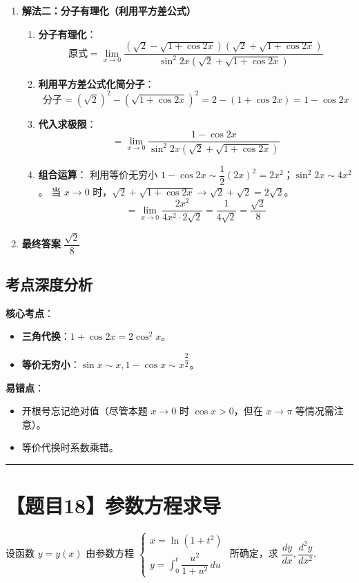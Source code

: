 \documentclass[UTF8,10pt]{ctexart}
\newenvironment{redenv}{\color{red}}{}
\newenvironment{detailedanalysis}{%
    \color{red}
    \begin{enumerate}[label=\textbf{第\arabic*步：}, leftmargin=*, align=left, itemsep=0pt, parsep=0pt, topsep=0pt, partopsep=0pt]
}{%
    \end{enumerate}
}
\newenvironment{conceptbox}{%
    \begin{tcolorbox}[colback=red!5, colframe=red!50!black, title=概念解析, fonttitle=\bfseries, top=2pt, bottom=2pt, left=2pt, right=2pt]
}{%
    \end{tcolorbox}
}
\newcommand{\problemrule}{\par\filbreak\noindent\rule{\textwidth}{1.5pt}\vspace{-0.5em}}
\begin{document}
\begin{redenv}
\begin{detailedanalysis}
\item \textbf{解法二：分子有理化（利用平方差公式）}
\begin{enumerate}[label=(\alph*)]
    \item \textbf{分子有理化}：
    \[ \text{原式} = \lim\limits_{x \to 0} \dfrac{(\sqrt{2} - \sqrt{1 + \cos 2x})(\sqrt{2} + \sqrt{1 + \cos 2x})}{\sin^2 2x (\sqrt{2} + \sqrt{1 + \cos 2x})} \]
    \item \textbf{利用平方差公式化简分子}：
    \[ \text{分子} = (\sqrt{2})^2 - (\sqrt{1+\cos 2x})^2 = 2 - (1 + \cos 2x) = 1 - \cos 2x \]
    \item \textbf{代入求极限}：
    \[ = \lim\limits_{x \to 0} \dfrac{1 - \cos 2x}{\sin^2 2x (\sqrt{2} + \sqrt{1 + \cos 2x})} \]
    \item \textbf{组合运算}：
    利用等价无穷小 $1 - \cos 2x \sim \dfrac{1}{2}(2x)^2 = 2x^2$；$\sin^2 2x \sim 4x^2$。
    当 $x \to 0$ 时，$\sqrt{2} + \sqrt{1 + \cos 2x} \to \sqrt{2} + \sqrt{2} = 2\sqrt{2}$。
    \[ = \lim\limits_{x \to 0} \dfrac{2x^2}{4x^2 \cdot 2\sqrt{2}} = \dfrac{1}{4\sqrt{2}} = \dfrac{\sqrt{2}}{8} \]
\end{enumerate}

\item \textbf{最终答案}
$\dfrac{\sqrt{2}}{8}$
\end{detailedanalysis}

\subsection*{考点深度分析}
\begin{conceptbox}
\textbf{核心考点}：
\begin{itemize}
    \item \textbf{三角代换}：$1+\cos 2x = 2\cos^2 x$。
    \item \textbf{等价无穷小}：$\sin x \sim x, 1-\cos x \sim x^\dfrac{2}{2}$。
\end{itemize}
\textbf{易错点}：
\begin{itemize}
    \item 开根号忘记绝对值（尽管本题 $x \to 0$ 时 $\cos x > 0$，但在 $x \to \pi$ 等情况需注意）。
    \item 等价代换时系数乘错。
\end{itemize}
\end{conceptbox}
\end{redenv}

\problemrule
\section*{【题目18】参数方程求导}
设函数 $y = y(x)$ 由参数方程 $\begin{cases} x = \ln(1+t^2) \\ y = \int_0^t \dfrac{u^2}{1+u^2}\, du \end{cases}$ 所确定，求 $\dfrac{dy}{dx}, \dfrac{d^2y}{dx^2}$.
\end{document}
